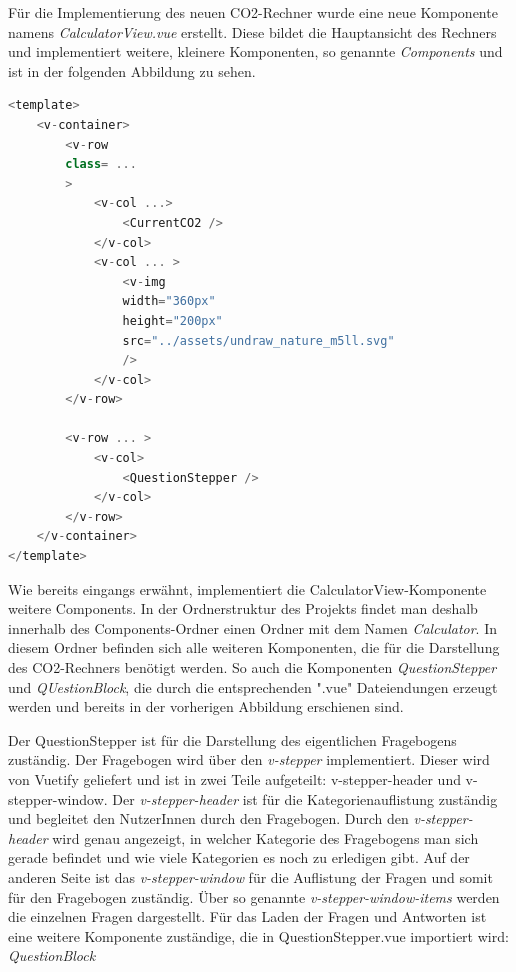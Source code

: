 Für die Implementierung des neuen CO2-Rechner wurde eine neue Komponente namens \textit{CalculatorView.vue} erstellt. Diese bildet die Hauptansicht des Rechners und implementiert weitere, kleinere Komponenten, so genannte \textit{Components} und ist in der folgenden Abbildung zu sehen.

\begin{lstlisting}[language={JavaScript}, caption={Aufbau der CalculatorView.vue Komponente}]
<template>
    <v-container>
        <v-row
        class= ...
        >
            <v-col ...>
                <CurrentCO2 />
            </v-col>
            <v-col ... >
                <v-img
                width="360px"
                height="200px"
                src="../assets/undraw_nature_m5ll.svg"
                />
            </v-col>
        </v-row>

        <v-row ... >
            <v-col>
                <QuestionStepper />
            </v-col>
        </v-row>
    </v-container>
</template>
\end{lstlisting}

Wie bereits eingangs erwähnt, implementiert die CalculatorView-Komponente weitere Components. In der Ordnerstruktur des Projekts findet man deshalb innerhalb des Components-Ordner einen Ordner mit dem Namen \textit{Calculator}. In diesem Ordner befinden sich alle weiteren Komponenten, die für die Darstellung des CO2-Rechners benötigt werden. So auch die Komponenten \textit{QuestionStepper} und \textit{QUestionBlock}, die durch die entsprechenden ".vue" Dateiendungen erzeugt werden und bereits in der vorherigen Abbildung erschienen sind.

Der QuestionStepper ist für die Darstellung des eigentlichen Fragebogens zuständig. Der Fragebogen wird über den \textit{v-stepper} implementiert. Dieser wird von Vuetify geliefert und ist in zwei Teile aufgeteilt: v-stepper-header und v-stepper-window. Der \textit{v-stepper-header} ist für die Kategorienauflistung zuständig und begleitet den NutzerInnen durch den Fragebogen. Durch den \textit{v-stepper-header} wird genau angezeigt, in welcher Kategorie des Fragebogens man sich gerade befindet und wie viele Kategorien es noch zu erledigen gibt. Auf der anderen Seite ist das \textit{v-stepper-window} für die Auflistung der Fragen und somit für den Fragebogen zuständig. Über so genannte \textit{v-stepper-window-items} werden die einzelnen Fragen dargestellt. Für das Laden der Fragen und Antworten ist eine weitere Komponente zuständige, die in QuestionStepper.vue importiert wird: \textit{QuestionBlock}

